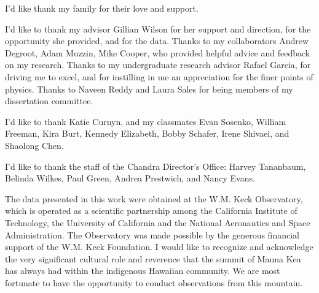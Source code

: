 \begin{acknowledgements}


I'd like thank my family for their love and support.

I'd like to thank my advisor Gillian Wilson for her support and direction, for the opportunity she provided, and for the data.
Thanks to my collaborators Andrew Degroot, Adam Muzzin, Mike Cooper, who provided helpful advice and feedback on my research.
Thanks to my undergraduate research advisor Rafael Garcia, for driving me to excel, and for instilling in me an appreciation for the finer points of physics.
Thanks to Naveen Reddy and Laura Sales for being members of my dissertation committee.

I'd like to thank Katie Curnyn, and my classmates Evan Sosenko, William Freeman, Kira Burt, Kennedy Elizabeth, Bobby Schafer, Irene Shivaei, and Shaolong Chen.

I'd like to thank the staff of the Chandra Director's Office: Harvey Tananbaum, Belinda Wilkes, Paul Green, Andrea Prestwich, and Nancy Evans.


The data presented in this work were obtained at the W.M. Keck Observatory, which is operated as a scientific partnership among the California Institute of Technology, the University of California and the National Aeronautics and Space Administration. The Observatory was made possible by the generous financial support of the W.M. Keck Foundation. I would like to recognize and acknowledge the very significant cultural role and reverence that the summit of Mauna Kea has always had within the indigenous Hawaiian community.  We are most fortunate to have the opportunity to conduct observations from this mountain.

\end{acknowledgements}

